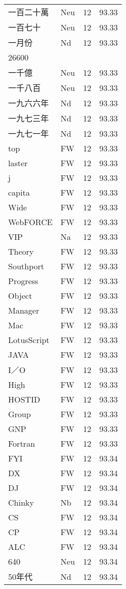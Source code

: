 \documentclass[twocolumn]{book}
\begin{document}
\begin{supertabular}{llrr}
一百二十萬 & Neu & 12 &  93.33\\
一百七十 & Neu & 12 &  93.33\\
一月份 & Nd & 12 &  93.33\\
26600\\
一千億 & Neu & 12 &  93.33\\
一千八百 & Neu & 12 &  93.33\\
一九六六年 & Nd & 12 &  93.33\\
一九七三年 & Nd & 12 &  93.33\\
一九七一年 & Nd & 12 &  93.33\\
top & FW & 12 &  93.33\\
laster & FW & 12 &  93.33\\
j & FW & 12 &  93.33\\
capita & FW & 12 &  93.33\\
Wide & FW & 12 &  93.33\\
WebFORCE & FW & 12 &  93.33\\
VIP & Na & 12 &  93.33\\
Theory & FW & 12 &  93.33\\
Southport & FW & 12 &  93.33\\
Progress & FW & 12 &  93.33\\
Object & FW & 12 &  93.33\\
Manager & FW & 12 &  93.33\\
Mac & FW & 12 &  93.33\\
LotusScript & FW & 12 &  93.33\\
JAVA & FW & 12 &  93.33\\
I／O & FW & 12 &  93.33\\
High & FW & 12 &  93.33\\
HOSTID & FW & 12 &  93.33\\
Group & FW & 12 &  93.33\\
GNP & FW & 12 &  93.33\\
Fortran & FW & 12 &  93.33\\
FYI & FW & 12 &  93.34\\
DX & FW & 12 &  93.34\\
DJ & FW & 12 &  93.34\\
Chinky & Nb & 12 &  93.34\\
CS & FW & 12 &  93.34\\
CP & FW & 12 &  93.34\\
ALC & FW & 12 &  93.34\\
640 & Neu & 12 &  93.34\\
50年代 & Nd & 12 &  93.34\\

\end{supertabular}
\end{document}
